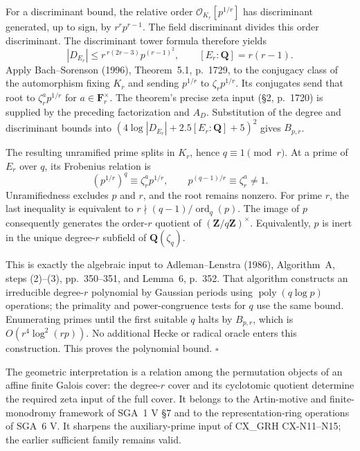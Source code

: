 For a discriminant bound, the relative order
$\mathcal O_{K_r}[p^{1/r}]$ has discriminant generated, up to sign, by
$r^r p^{r-1}$. The field discriminant divides this order discriminant.
The discriminant tower formula therefore yields
\[
      |D_{E_r}|\le
                  r^{\,r(2r-3)}p^{(r-1)^2},
      \qquad [E_r:\mathbf Q]=r(r-1).
\]
Apply Bach--Sorenson (1996), Theorem~5.1, p.~1729, to the conjugacy
class of the automorphism fixing $K_r$ and sending $p^{1/r}$ to
$\zeta_r p^{1/r}$. Its conjugates send that root to
$\zeta_r^a p^{1/r}$ for $a\in\mathbf F_r^\times$.
The theorem's precise zeta input (\S2, p.~1720) is supplied by the
preceding factorization and $A_D$. Substitution of the degree and
discriminant bounds into $(4\log|D_{E_r}|+2.5[E_r:\mathbf Q]+5)^2$
gives $B_{p,r}$.

The resulting unramified prime splits in $K_r$, hence $q\equiv1\pmod r$.
At a prime of $E_r$ over $q$, its Frobenius relation is
\[
       (p^{1/r})^q\equiv\zeta_r^a p^{1/r},\qquad
              p^{(q-1)/r}\equiv\zeta_r^a\ne1.
\]
Unramifiedness excludes $p$ and $r$, and the root remains nonzero.
For prime $r$, the last inequality is equivalent to
$r\nmid(q-1)/\operatorname{ord}_q(p)$.
The image of $p$ consequently generates the order-$r$ quotient of
$(\mathbf Z/q\mathbf Z)^\times$. Equivalently, $p$ is inert in the
unique degree-$r$ subfield of $\mathbf Q(\zeta_q)$.

This is exactly the algebraic input to Adleman--Lenstra (1986),
Algorithm~A, steps (2)--(3), pp.~350--351, and Lemma~6, p.~352.
That algorithm constructs an irreducible degree-$r$ polynomial by
Gaussian periods using $\operatorname{poly}(q\log p)$ operations;
the primality and power-congruence tests for $q$ use the same bound.
Enumerating primes until the first suitable $q$ halts by $B_{p,r}$,
which is $O(r^4\log^2(rp))$. No additional Hecke or radical oracle
enters this construction. This proves the polynomial bound.
\hfill$\square$

The geometric interpretation is a relation among the permutation
objects of an affine finite Galois cover: the degree-$r$ cover and its
cyclotomic quotient determine the required zeta input of the full cover.
It belongs to the Artin-motive and finite-monodromy framework of SGA~1
V \S7 and to the representation-ring operations of SGA~6 V.
It sharpens the auxiliary-prime input of CX\_GRH CX-N11--N15;
the earlier sufficient family remains valid.

